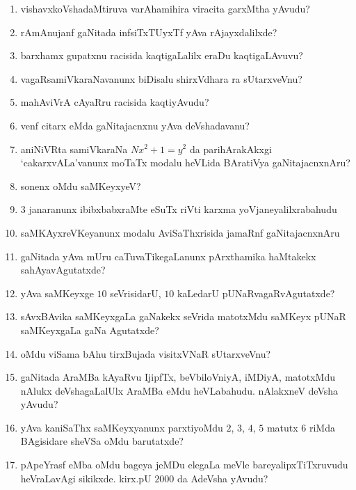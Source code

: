 \begin{enumerate}
\item vishavxkoVshadaMtiruva varAhamihira viracita garxMtha yAvudu?
  
\item rAmAnujanf gaNitada infsiTxTUyxTf yAva rAjayxdalilxde?
  
\item barxhamx gupatxnu racisida kaqtigaLalilx eraDu kaqtigaLAvuvu?

\item vagaRsamiVkaraNavanunx biDisalu shirxVdhara ra sUtarxveVnu?

\item mahAviVrA cAyaRru racisida kaqtiyAvudu?
  
\item venf citarx eMda gaNitajacnxnu yAva deVshadavanu?
  
\item aniNiVRta samiVkaraNa $Nx^2 +1 =y^2$ da parihArakAkxgi `cakarxvALa'vanunx moTaTx modalu heVLida BAratiVya gaNitajacnxnAru?
  
\item sonenx oMdu saMKeyxyeV?
  
\item $3$ janaranunx ibibxbabxraMte eSuTx riVti karxma yoVjaneyalilxrabahudu
  
\item saMKAyxreVKeyanunx modalu AviSaThxrisida jamaRnf gaNitajacnxnAru
  
\item gaNitada yAva mUru caTuvaTikegaLanunx pArxthamika haMtakekx sahAyavAgutatxde?
  
\item yAva saMKeyxge $10$ seVrisidarU, $10$ kaLedarU pUNaRvagaRvAgutatxde?

\item sAvxBAvika saMKeyxgaLa gaNakekx seVrida matotxMdu saMKeyx pUNaR saMKeyxgaLa gaNa Agutatxde?
  
\item oMdu viSama bAhu tirxBujada visitxVNaR sUtarxveVnu?
  
\item gaNitada AraMBa kAyaRvu IjipfTx, beVbiloVniyA, iMDiyA, matotxMdu nAlukx deVshagaLalUlx AraMBa eMdu heVLabahudu. nAlakxneV deVsha yAvudu?
  
\item yAva kaniSaThx saMKeyxyanunx parxtiyoMdu $2$, $3$, $4$, $5$ matutx $6$ riMda BAgisidare sheVSa oMdu barutatxde?
  
\item pApeYrasf eMba oMdu bageya jeMDu elegaLa meVle bareyalipxTiTxruvudu heVraLavAgi sikikxde. kirx.pU $2000$ da AdeVsha yAvudu?
  

\end{enumerate}
